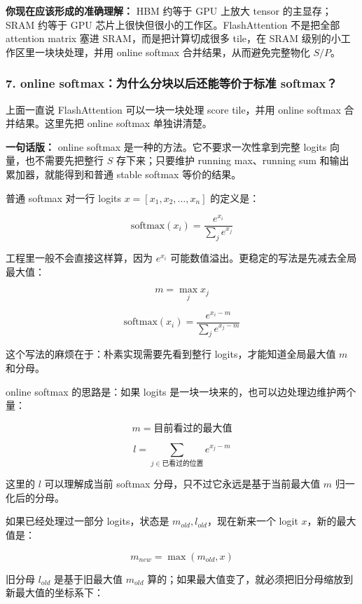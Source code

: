\begin{summarybox}
\textbf{你现在应该形成的准确理解：} HBM 约等于 GPU 上放大 tensor 的主显存；SRAM 约等于 GPU 芯片上很快但很小的工作区。FlashAttention 不是把全部 attention matrix 塞进 SRAM，而是把计算切成很多 tile，在 SRAM 级别的小工作区里一块块处理，并用 online softmax 合并结果，从而避免完整物化 $S/P$。
\end{summarybox}

\subsubsection*{7. online softmax：为什么分块以后还能等价于标准 softmax？}

上面一直说 FlashAttention 可以一块一块处理 score tile，并用 online softmax 合并结果。这里先把 online softmax 单独讲清楚。

\begin{conceptbox}
\textbf{一句话版：} online softmax 是一种的方法。它不要求一次性拿到完整 logits 向量，也不需要先把整行 $S$ 存下来；只要维护 running max、running sum 和输出累加器，就能得到和普通 stable softmax 等价的结果。
\end{conceptbox}

普通 softmax 对一行 logits $x=[x_1,x_2,\dots,x_n]$ 的定义是：

\[
\mathrm{softmax}(x_i)=\frac{e^{x_i}}{\sum_j e^{x_j}}
\]

工程里一般不会直接这样算，因为 $e^{x_i}$ 可能数值溢出。更稳定的写法是先减去全局最大值：

\[
m=\max_j x_j
\]

\[
\mathrm{softmax}(x_i)=\frac{e^{x_i-m}}{\sum_j e^{x_j-m}}
\]

这个写法的麻烦在于：朴素实现需要先看到整行 logits，才能知道全局最大值 $m$ 和分母。

online softmax 的思路是：如果 logits 是一块一块来的，也可以边处理边维护两个量：

\[
m=\text{目前看过的最大值}
\]

\[
l=\sum_{j \in \text{已看过的位置}} e^{x_j-m}
\]

这里的 $l$ 可以理解成当前 softmax 分母，只不过它永远是基于当前最大值 $m$ 归一化后的分母。

如果已经处理过一部分 logits，状态是 $m_{old},l_{old}$，现在新来一个 logit $x$，新的最大值是：

\[
m_{new}=\max(m_{old},x)
\]

旧分母 $l_{old}$ 是基于旧最大值 $m_{old}$ 算的；如果最大值变了，就必须把旧分母缩放到新最大值的坐标系下：

